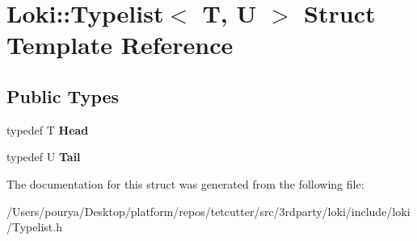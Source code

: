 \hypertarget{structLoki_1_1Typelist}{}\section{Loki\+:\+:Typelist$<$ T, U $>$ Struct Template Reference}
\label{structLoki_1_1Typelist}
\subsection*{Public Types}
\begin{DoxyCompactItemize}
\item 
\hypertarget{structLoki_1_1Typelist_a2d2db3e677822582a453ca93a0c453a8}{}typedef T {\bfseries Head}\label{structLoki_1_1Typelist_a2d2db3e677822582a453ca93a0c453a8}

\item 
\hypertarget{structLoki_1_1Typelist_aa5a217cfd68e89c3136b32f598bb94f0}{}typedef U {\bfseries Tail}\label{structLoki_1_1Typelist_aa5a217cfd68e89c3136b32f598bb94f0}

\end{DoxyCompactItemize}


The documentation for this struct was generated from the following file\+:\begin{DoxyCompactItemize}
\item 
/\+Users/pourya/\+Desktop/platform/repos/tetcutter/src/3rdparty/loki/include/loki/Typelist.\+h\end{DoxyCompactItemize}
